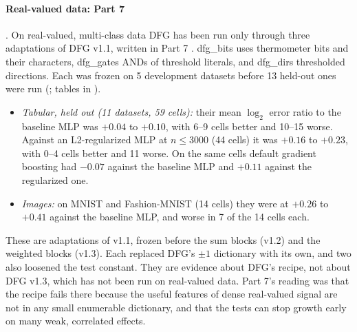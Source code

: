\paragraph{Real-valued data: Part 7} . On real-valued, multi-class data DFG has been run only through three adaptations of DFG v1.1, written in Part 7 \cite{discretelearners2026}. dfg\_bits uses thermometer bits and their characters, dfg\_gates ANDs of threshold literals, and dfg\_dirs thresholded directions. Each was frozen on 5 development datasets before 13 held-out ones were run (; tables in ).
\begin{itemize}
\item \emph{Tabular, held out (11 datasets, 59 cells):} their mean $\log_2$ error ratio to the baseline MLP was $+0.04$ to $+0.10$, with 6--9 cells better and 10--15 worse. Against an L2-regularized MLP at $n\le3000$ (44 cells) it was $+0.16$ to $+0.23$, with 0--4 cells better and 11 worse. On the same cells default gradient boosting had $-0.07$ against the baseline MLP and $+0.11$ against the regularized one.
\item \emph{Images:} on MNIST and Fashion-MNIST (14 cells) they were at $+0.26$ to $+0.41$ against the baseline MLP, and worse in 7 of the 14 cells each.
\end{itemize}
These are adaptations of v1.1, frozen before the sum blocks (v1.2) and the weighted blocks (v1.3). Each replaced DFG's $\pm1$ dictionary with its own, and two also loosened the test constant. They are evidence about DFG's recipe, not about DFG v1.3, which has not been run on real-valued data. Part 7's reading  was that the recipe fails there because the useful features of dense real-valued signal are not in any small enumerable dictionary, and that the tests can stop growth early on many weak, correlated effects.

